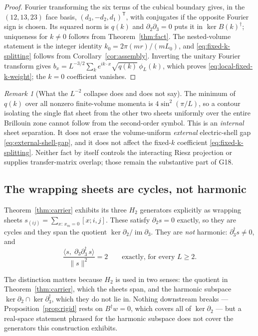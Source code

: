\documentclass[11pt]{article}
\theoremstyle{plain}
\theoremstyle{definition}
\theoremstyle{remark}
\newtheorem{remark}[theorem]{Remark}
\newcommand{\chk}[1]{}
\newcommand{\dg}{^{\dagger}}
\begin{document}
\begin{proof}
Fourier transforming the six terms of the cubical boundary gives, in the
$(12,13,23)$ face basis, $(d_3,-d_2,d_1)^{\mathsf T}$, with conjugates if the
opposite Fourier sign is chosen. Its squared norm is $q(k)$ and
$\partial_2\partial_3=0$ puts it in $\ker B(k)\dg$; uniqueness for $k\ne0$
follows from Theorem~\ref{thm:fact}. The nested-volume statement is the
integer identity $k_0=2\pi(mr)/(mL_0)$, and
\eqref{eq:fixed-k-splitting} follows from
Corollary~\ref{cor:assembly}. Inverting the unitary Fourier transform gives
$b_x=L^{-3/2}\sum_k e^{ik\cdot x}\sqrt{q(k)}\,\phi_L(k)$, which proves
\eqref{eq:local-fixed-k-weight}; the $k=0$ coefficient vanishes.
\end{proof}

\begin{remark}[What the $L^{-2}$ collapse does and does not say]
The minimum of $q(k)$ over all nonzero finite-volume momenta is
$4\sin^2(\pi/L)$, so a contour isolating the single flat sheet from the other
two sheets uniformly over the entire Brillouin zone cannot follow from the
second-order symbol. This is an \emph{internal} sheet separation. It does not
erase the volume-uniform \emph{external} electric-shell gap
\eqref{eq:external-shell-gap}, and it does not affect the fixed-$k$ coefficient
\eqref{eq:fixed-k-splitting}. Neither fact by itself controls the interacting
Riesz projection or supplies transfer-matrix overlap; those remain the
substantive part of G18.
\end{remark}

\subsection{The wrapping sheets are cycles, not harmonic}

Theorem~\ref{thm:carrier} exhibits its three $H_2$ generators explicitly as
wrapping sheets $s_{(ij)}=\sum_{x:\,x_m=0}[x;i,j]$. These satisfy
$\partial_2 s=0$ exactly, so they are cycles and they span the quotient
$\ker\partial_2/\operatorname{im}\partial_3$. They are \emph{not} harmonic:
$\partial_3\dg s\neq0$, and
\begin{equation}
  \frac{\langle s,\;\partial_3\partial_3\dg\,s\rangle}{\|s\|^2}=2
  \qquad\text{exactly, for every }L\ge2 .
\end{equation}
\chk{FINDING: the wrapping sheets are cycles but NOT harmonic}

The distinction matters because $H_2$ is used in two senses: the quotient in
Theorem~\ref{thm:carrier}, which the sheets span, and the harmonic subspace
$\ker\partial_2\cap\ker\partial_3\dg$, which they do not lie in. Nothing
downstream breaks --- Proposition~\ref{prop:rigid} rests on $B\dg w=0$, which
covers all of $\ker\partial_2$ --- but a real-space statement phrased for the
harmonic subspace does not cover the generators this construction exhibits.
\end{document}
